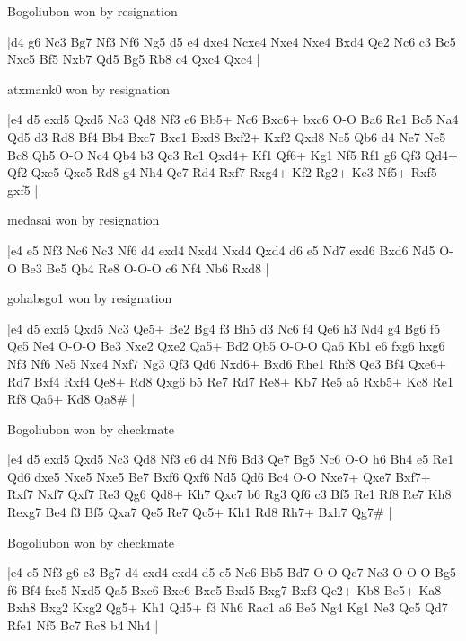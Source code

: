 \showboard

Bogoliubon won by resignation

\makegametitle
|d4 g6 Nc3 Bg7 Nf3 Nf6 Ng5 d5 e4 dxe4 Ncxe4 Nxe4 Nxe4 Bxd4 Qe2 Nc6 c3 Bc5 Nxc5 Bf5 Nxb7 Qd5 Bg5 Rb8 c4 Qxc4 Qxc4  |

\showboard

atxmank0 won by resignation

\makegametitle
|e4 d5 exd5 Qxd5 Nc3 Qd8 Nf3 e6 Bb5+ Nc6 Bxc6+ bxc6 O-O Ba6 Re1 Bc5 Na4 Qd5 d3 Rd8 Bf4 Bb4 Bxc7 Bxe1 Bxd8 Bxf2+ Kxf2 Qxd8 Nc5 Qb6 d4 Ne7 Ne5 Bc8 Qh5 O-O Nc4 Qb4 b3 Qc3 Re1 Qxd4+ Kf1 Qf6+ Kg1 Nf5 Rf1 g6 Qf3 Qd4+ Qf2 Qxc5 Qxc5 Rd8 g4 Nh4 Qe7 Rd4 Rxf7 Rxg4+ Kf2 Rg2+ Ke3 Nf5+ Rxf5 gxf5  |

\showboard

medasai won by resignation

\makegametitle
|e4 e5 Nf3 Nc6 Nc3 Nf6 d4 exd4 Nxd4 Nxd4 Qxd4 d6 e5 Nd7 exd6 Bxd6 Nd5 O-O Be3 Be5 Qb4 Re8 O-O-O c6 Nf4 Nb6 Rxd8  |

\showboard

gohabsgo1 won by resignation

\makegametitle
|e4 d5 exd5 Qxd5 Nc3 Qe5+ Be2 Bg4 f3 Bh5 d3 Nc6 f4 Qe6 h3 Nd4 g4 Bg6 f5 Qe5 Ne4 O-O-O Be3 Nxe2 Qxe2 Qa5+ Bd2 Qb5 O-O-O Qa6 Kb1 e6 fxg6 hxg6 Nf3 Nf6 Ne5 Nxe4 Nxf7 Ng3 Qf3 Qd6 Nxd6+ Bxd6 Rhe1 Rhf8 Qe3 Bf4 Qxe6+ Rd7 Bxf4 Rxf4 Qe8+ Rd8 Qxg6 b5 Re7 Rd7 Re8+ Kb7 Re5 a5 Rxb5+ Kc8 Re1 Rf8 Qa6+ Kd8 Qa8\#  |

\showboard

Bogoliubon won by checkmate

\makegametitle
|e4 d5 exd5 Qxd5 Nc3 Qd8 Nf3 e6 d4 Nf6 Bd3 Qe7 Bg5 Nc6 O-O h6 Bh4 e5 Re1 Qd6 dxe5 Nxe5 Nxe5 Be7 Bxf6 Qxf6 Nd5 Qd6 Bc4 O-O Nxe7+ Qxe7 Bxf7+ Rxf7 Nxf7 Qxf7 Re3 Qg6 Qd8+ Kh7 Qxc7 b6 Rg3 Qf6 c3 Bf5 Re1 Rf8 Re7 Kh8 Rexg7 Be4 f3 Bf5 Qxa7 Qe5 Re7 Qc5+ Kh1 Rd8 Rh7+ Bxh7 Qg7\#  |

\showboard

Bogoliubon won by checkmate

\makegametitle
|e4 c5 Nf3 g6 c3 Bg7 d4 cxd4 cxd4 d5 e5 Nc6 Bb5 Bd7 O-O Qc7 Nc3 O-O-O Bg5 f6 Bf4 fxe5 Nxd5 Qa5 Bxc6 Bxc6 Bxe5 Bxd5 Bxg7 Bxf3 Qc2+ Kb8 Be5+ Ka8 Bxh8 Bxg2 Kxg2 Qg5+ Kh1 Qd5+ f3 Nh6 Rac1 a6 Be5 Ng4 Kg1 Ne3 Qc5 Qd7 Rfe1 Nf5 Bc7 Rc8 b4 Nh4  |

